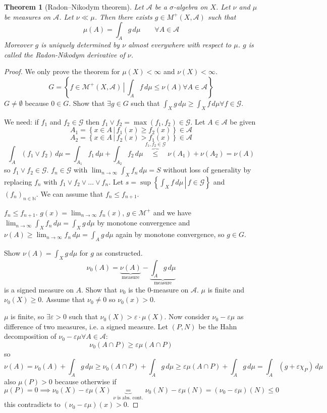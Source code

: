 \documentclass{article}
\newtheorem{theorem}{Theorem}  \numberwithin{theorem}{section}
\newcommand{\setdef}[2]{\left\{\left.#1\,\right|\,#2\right\}}
\begin{document}
\begin{theorem}[Radon–Nikodym theorem]
  Let $\mathcal A$ be a $\sigma$-algebra on $X$. Let $\nu$ and $\mu$ be measures on $\mathcal A$.
  Let $\nu \ll \mu$. Then there exists $g \in M^+(X, \mathcal A)$ such that
  \[ \mu(A) = \int_A g \, d\mu \qquad \forall A \in \mathcal A \]
  Moreover $g$ is uniquely determined by $\nu$ almost everywhere with respect to $\mu$.
  $g$ is called the Radon-Nikodym derivative of $\nu$.
\end{theorem}
\begin{proof}
  We only prove the theorem for $\mu(X) < \infty$ and $\nu(X) < \infty$.
  \[ G = \setdef{f \in \mathcal M^+(X, \mathcal A)}{\int_A f \, d\mu \leq \nu(A) \forall A \in \mathcal A} \]
  $G \neq \emptyset$ because $0 \in G$. Show that $\exists g \in G$ such that $\int_{X} g \, d\mu \geq \int_X f \, d\mu \forall f \in \mathcal G$.

  We need: if $f_1$ and $f_2 \in \mathcal G$ then $f_1 \lor f_2 = \max(f_1, f_2) \in \mathcal G$. Let $A \in \mathcal A$ be given
  \[ A_1 = \setdef{x \in A}{f_1(x) \geq f_2(x)} \in \mathcal A \]
  \[ A_2 = \setdef{x \in A}{f_2(x) > f_1(x)} \in \mathcal A \]
  \[ \int_A(f_1 \lor f_2) \, d\mu = \int_{A_1} f_1 \, d\mu + \int_{A_2} f_2 \, d\mu \overbrace{\leq}^{f_1, f_2 \in \mathcal G} \nu(A_1) + \nu(A_2) = \nu(A) \]
  so $f_1 \lor f_2 \in \mathcal G$.
  $f_n \in \mathcal G$ with $\lim_{n\to\infty} \int_X f_n \, d\mu = S$ without loss of generality by replacing $f_n$ with $f_1 \lor f_2 \lor \ldots \lor f_n$.
  Let $s = \sup\setdef{\int_X f \, d\mu}{f \in \mathcal G}$ and $(f_n)_{n\in\mathbb N}$. We can assume that $f_n \leq f_{n+1}$.

  $f_n \leq f_{n+1}$. $g(x) = \lim_{n\to\infty} f_n(x)$, $g \in \mathcal M^+$ and we have $\lim_{n\to\infty} \int_X f_n \, d\mu = \int_X g \, d\mu$
  by monotone convergence and $\nu(A) \geq \lim_{n\to\infty} f_n \, d\mu = \int_A g \, d\mu$ again by monotone convergence, so $g \in G$.

  Show $\nu(A) = \int_X g \, d\mu$ for $g$ as constructed.
  \[ \nu_0(A) = \underbrace{\nu(A)}_{\text{measure}} - \underbrace{\int_A g \, d\mu}_{\text{measure}} \]
  is a signed measure on $A$. Show that $\nu_0$ is the $0$-measure on $\mathcal A$.
  $\mu$ is finite and $\nu_0(X) \geq 0$. Assume that $\nu_0 \neq 0$ so $\nu_0(x) > 0$.

  $\mu$ is finite, so $\exists \varepsilon > 0$ such that $\nu_0(X) > \varepsilon \cdot \mu(X)$.
  Now consider $\nu_0 - \varepsilon \mu$ as difference of two measures, i.e. a signed measure.
  Let $(P, N)$ be the Hahn decomposition of $\nu_0 - \varepsilon \mu \forall A \in \mathcal A$:
  \[ \nu_0(A \cap P) \geq \varepsilon \mu(A \cap P) \]
  so
  \[ \nu(A) = \nu_0(A) + \int_A g \, d\mu \geq \nu_0(A \cap P) + \int_A g \, d\mu \geq \varepsilon \mu(A \cap P) + \int_A g \, d\mu = \int_A (g + \varepsilon \chi_P) \, d\mu \]
  also $\mu(P) > 0$ because otherwise if
  \[ \mu(P) = 0 \implies \nu_0(X) - \varepsilon \mu(X) \underbrace{=}_{\nu \text{ is abs. cont.}} \nu_0(N) - \varepsilon \mu(N) = (\nu_0 - \varepsilon \mu)(N)  \leq 0 \]
  this contradicts to $(\nu_0 - \varepsilon \mu)(x) > 0$.


\end{proof}
\end{document}
